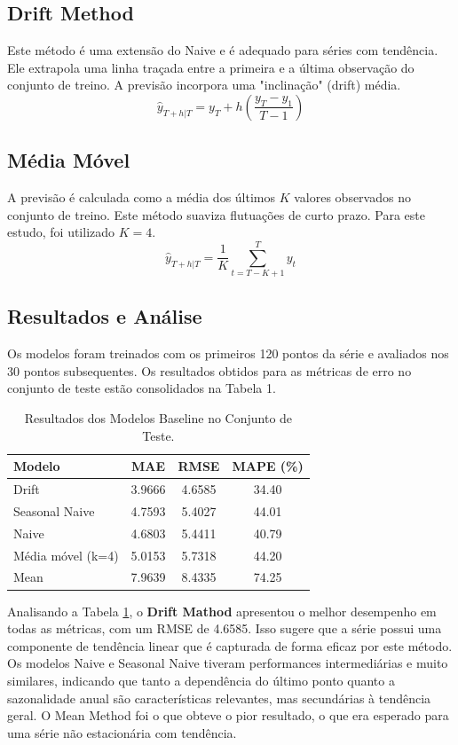 \documentclass{article}
\begin{document}
\subsection*{Drift Method}
Este método é uma extensão do Naive e é adequado para séries com tendência. Ele extrapola uma linha traçada entre a primeira e a última observação do conjunto de treino. A previsão incorpora uma "inclinação" (drift) média.
$$ \hat{y}_{T+h|T} = y_T + h \left( \frac{y_T - y_1}{T-1} \right) $$

\subsection*{Média Móvel}
A previsão é calculada como a média dos últimos $K$ valores observados no conjunto de treino. Este método suaviza flutuações de curto prazo. Para este estudo, foi utilizado $K=4$.
$$ \hat{y}_{T+h|T} = \frac{1}{K}\sum_{t=T-K+1}^{T}y_t $$

\subsection*{Resultados e Análise}
Os modelos foram treinados com os primeiros 120 pontos da série e avaliados nos 30 pontos subsequentes. Os resultados obtidos para as métricas de erro no conjunto de teste estão consolidados na Tabela 1.

\begin{table}[h]
    \centering
    \begin{tabular}{|l|c|c|c|}
        \hline
        \textbf{Modelo} & \textbf{MAE} & \textbf{RMSE} & \textbf{MAPE (\%)} \\
        \hline
        Drift & 3.9666 & 4.6585 & 34.40 \\
        Seasonal Naive & 4.7593 & 5.4027 & 44.01 \\
        Naive & 4.6803 & 5.4411 & 40.79 \\
        Média móvel (k=4) & 5.0153 & 5.7318 & 44.20 \\
        Mean & 7.9639 & 8.4335 & 74.25 \\
        \hline
    \end{tabular}
    \caption{Resultados dos Modelos Baseline no Conjunto de Teste.}
    \label{tab:baseline_results}
\end{table}

Analisando a Tabela \ref{tab:baseline_results}, o \textbf{Drift Mathod} apresentou o melhor desempenho em todas as métricas, com um RMSE de 4.6585. Isso sugere que a série possui uma componente de tendência linear que é capturada de forma eficaz por este método. Os modelos Naive e Seasonal Naive tiveram performances intermediárias e muito similares, indicando que tanto a dependência do último ponto quanto a sazonalidade anual são características relevantes, mas secundárias à tendência geral. O Mean Method foi o que obteve o pior resultado, o que era esperado para uma série não estacionária com tendência.
\end{document}
